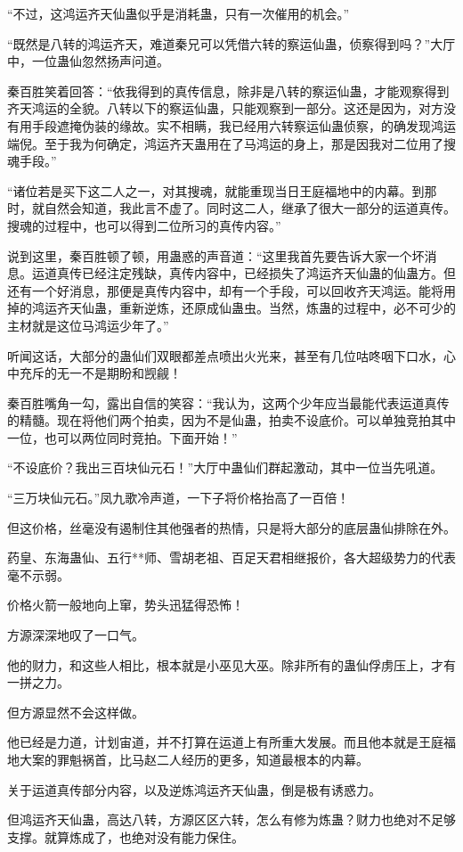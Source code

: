\begin{this_body}
“不过，这鸿运齐天仙蛊似乎是消耗蛊，只有一次催用的机会。”

“既然是八转的鸿运齐天，难道秦兄可以凭借六转的察运仙蛊，侦察得到吗？”大厅中，一位蛊仙忽然扬声问道。

秦百胜笑着回答：“依我得到的真传信息，除非是八转的察运仙蛊，才能观察得到齐天鸿运的全貌。八转以下的察运仙蛊，只能观察到一部分。这还是因为，对方没有用手段遮掩伪装的缘故。实不相瞒，我已经用六转察运仙蛊侦察，的确发现鸿运端倪。至于我为何确定，鸿运齐天蛊用在了马鸿运的身上，那是因我对二位用了搜魂手段。”

“诸位若是买下这二人之一，对其搜魂，就能重现当日王庭福地中的内幕。到那时，就自然会知道，我此言不虚了。同时这二人，继承了很大一部分的运道真传。搜魂的过程中，也可以得到二位所习的真传内容。”

说到这里，秦百胜顿了顿，用蛊惑的声音道：“这里我首先要告诉大家一个坏消息。运道真传已经注定残缺，真传内容中，已经损失了鸿运齐天仙蛊的仙蛊方。但还有一个好消息，那便是真传内容中，却有一个手段，可以回收齐天鸿运。能将用掉的鸿运齐天仙蛊，重新逆炼，还原成仙蛊虫。当然，炼蛊的过程中，必不可少的主材就是这位马鸿运少年了。”

听闻这话，大部分的蛊仙们双眼都差点喷出火光来，甚至有几位咕咚咽下口水，心中充斥的无一不是期盼和觊觎！

秦百胜嘴角一勾，露出自信的笑容：“我认为，这两个少年应当最能代表运道真传的精髓。现在将他们两个拍卖，因为不是仙蛊，拍卖不设底价。可以单独竞拍其中一位，也可以两位同时竞拍。下面开始！”

“不设底价？我出三百块仙元石！”大厅中蛊仙们群起激动，其中一位当先吼道。

“三万块仙元石。”凤九歌冷声道，一下子将价格抬高了一百倍！

但这价格，丝毫没有遏制住其他强者的热情，只是将大部分的底层蛊仙排除在外。

药皇、东海蛊仙、五行**师、雪胡老祖、百足天君相继报价，各大超级势力的代表毫不示弱。

价格火箭一般地向上窜，势头迅猛得恐怖！

方源深深地叹了一口气。

他的财力，和这些人相比，根本就是小巫见大巫。除非所有的蛊仙俘虏压上，才有一拼之力。

但方源显然不会这样做。

他已经是力道，计划宙道，并不打算在运道上有所重大发展。而且他本就是王庭福地大案的罪魁祸首，比马赵二人经历的更多，知道最根本的内幕。

关于运道真传部分内容，以及逆炼鸿运齐天仙蛊，倒是极有诱惑力。

但鸿运齐天仙蛊，高达八转，方源区区六转，怎么有修为炼蛊？财力也绝对不足够支撑。就算炼成了，也绝对没有能力保住。


\end{this_body}
